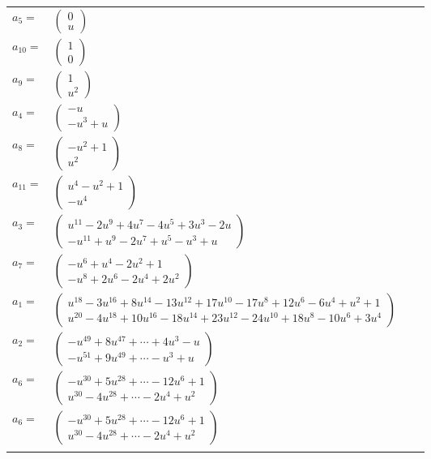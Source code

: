 \documentclass[1p]{elsarticle_modified}
\theoremstyle{definition}
\begin{document}
\begin{tabular}{m{7pt} m{180pt} m{7pt} m{180pt} }
\flushright $a_{5}=$&$\begin{pmatrix}0\\u\end{pmatrix}$ \\
\flushright $a_{10}=$&$\begin{pmatrix}1\\0\end{pmatrix}$ \\
\flushright $a_{9}=$&$\begin{pmatrix}1\\u^2\end{pmatrix}$ \\
\flushright $a_{4}=$&$\begin{pmatrix}- u\\- u^3+u\end{pmatrix}$ \\
\flushright $a_{8}=$&$\begin{pmatrix}- u^2+1\\u^2\end{pmatrix}$ \\
\flushright $a_{11}=$&$\begin{pmatrix}u^4- u^2+1\\- u^4\end{pmatrix}$ \\
\flushright $a_{3}=$&$\begin{pmatrix}u^{11}-2 u^9+4 u^7-4 u^5+3 u^3-2 u\\- u^{11}+u^9-2 u^7+u^5- u^3+u\end{pmatrix}$ \\
\flushright $a_{7}=$&$\begin{pmatrix}- u^6+u^4-2 u^2+1\\- u^8+2 u^6-2 u^4+2 u^2\end{pmatrix}$ \\
\flushright $a_{1}=$&$\begin{pmatrix}u^{18}-3 u^{16}+8 u^{14}-13 u^{12}+17 u^{10}-17 u^8+12 u^6-6 u^4+u^2+1\\u^{20}-4 u^{18}+10 u^{16}-18 u^{14}+23 u^{12}-24 u^{10}+18 u^8-10 u^6+3 u^4\end{pmatrix}$ \\
\flushright $a_{2}=$&$\begin{pmatrix}- u^{49}+8 u^{47}+\cdots+4 u^3- u\\- u^{51}+9 u^{49}+\cdots- u^3+u\end{pmatrix}$ \\
\flushright $a_{6}=$&$\begin{pmatrix}- u^{30}+5 u^{28}+\cdots-12 u^6+1\\u^{30}-4 u^{28}+\cdots-2 u^4+u^2\end{pmatrix}$\\ \flushright $a_{6}=$&$\begin{pmatrix}- u^{30}+5 u^{28}+\cdots-12 u^6+1\\u^{30}-4 u^{28}+\cdots-2 u^4+u^2\end{pmatrix}$\\&\end{tabular}
\end{document}
